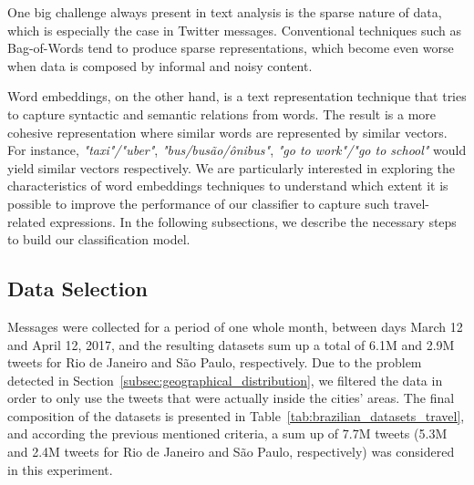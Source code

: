 One big challenge always present in text analysis is the sparse nature of data, which is especially the case in Twitter messages.
Conventional techniques such as Bag-of-Words tend to produce sparse representations, which become even worse when data is composed by informal and noisy content.

Word embeddings, on the other hand, is a text representation technique that tries to capture syntactic and semantic relations from words. The result is a more cohesive representation where similar words are represented by similar vectors. For instance, \emph{"taxi"/"uber"}, \emph{"bus/busão/ônibus"}, \emph{"go to work"/"go to school"} would yield similar vectors respectively.
We are particularly interested in exploring the characteristics of word embeddings techniques to understand which extent it is possible to improve the performance of our classifier to capture such travel-related expressions. In the following subsections, we describe the necessary steps to build our classification model.

\subsection{Data Selection}
Messages were collected for a period of one whole month, between days March 12 and April 12, 2017, and the resulting datasets sum up a total of 6.1M and 2.9M tweets for Rio de Janeiro and São Paulo, respectively. Due to the problem detected in Section~\ref{subsec:geographical_distribution}, we filtered the data in order to only use the tweets that were actually inside the cities' areas. The final composition of the datasets is presented in Table~\ref{tab:brazilian_datasets_travel}, and according the previous mentioned criteria, a sum up of 7.7M tweets (5.3M and 2.4M tweets for Rio de Janeiro and São Paulo, respectively) was considered in this experiment.

